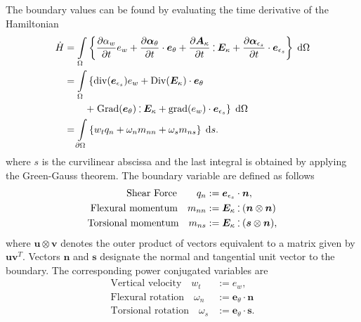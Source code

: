\documentclass{ifacconf}
\def\onedot{$\mathsurround0pt\ldotp$}
\def\cddot{%
	\mathbin{\vcenter{\baselineskip.67ex
			\hbox{\onedot}\hbox{\onedot}}%
}}
\begin{document}
The boundary values can be found by evaluating the time derivative of the Hamiltonian
\begin{equation}
\begin{aligned}
\dot{H}&= \int_{\Omega} \left\{ \diffp{\alpha_w}{t} e_w  + \diffp{\bm\alpha_\theta}{t} \cdot \bm{e}_\theta + \diffp{\bm{A}_{\kappa}}{t} \cddot \bm{E}_{\kappa}  + \diffp{\bm\alpha_{\epsilon_s}}{t} \cdot \bm{e}_{\epsilon_s} \right\} \d\Omega\\
&= \int_{\Omega} \left\{ \mathrm{div}(\bm{e}_{\epsilon_s}) e_w  + \mathrm{Div}(\bm{E}_{\kappa}) \cdot \bm{e}_\theta \right. \\
&\qquad  \left. + \; \mathrm{Grad}(\bm{e}_{\theta}) \cddot \bm{E}_{\kappa}  + \mathrm{grad} (e_w) \cdot \bm{e}_{\epsilon_s} \right\} \d\Omega \\
&= \int_{\partial \Omega} \left\{ w_t q_n  + \omega_n m_{nn} + \omega_s m_{ns} \right\} \d{s}.  \\
\end{aligned}
\end{equation}
where $s$ is the curvilinear abscissa and the last integral is obtained by applying the Green-Gauss theorem.
The boundary variable are defined as follows
\begin{equation}
\label{eq:QnMnnMns}
\begin{aligned}
\text{Shear Force}  \qquad q_{n} &:=  \bm{e}_{\epsilon_s} \cdot \bm{n},  \\
\text{Flexural momentum} \quad 
m_{nn} &:=   \bm{E}_{\kappa} \cddot (\bm{n}\otimes{\bm{n}}) 	\\
\text{Torsional momentum} \quad m_{ns} &:=  \bm{E}_{\kappa} \cddot (\bm{s} \otimes{\bm{n}}),	
\end{aligned}
\end{equation}
where $\bm{u} \otimes {\bm{v}}$ denotes the outer product of vectors equivalent to a matrix given by $\bm{u}\bm{v}^T$. Vectors $\bm{n}$ and $\bm{s}$ designate the normal and tangential unit vector to the boundary. The corresponding power conjugated variables are
\begin{equation}
\label{eq:wtwnws}
\begin{aligned}
\text{Vertical velocity}  \quad w_t &:= e_w, \\
\text{Flexural rotation} \quad 
\omega_{n} &:=  \bm{e}_\theta \cdot \bm{n} \\
\text{Torsional rotation} \quad 
\omega_{s} &:=  \bm{e}_\theta \cdot \bm{s}.
\end{aligned}
\end{equation}
\end{document}
